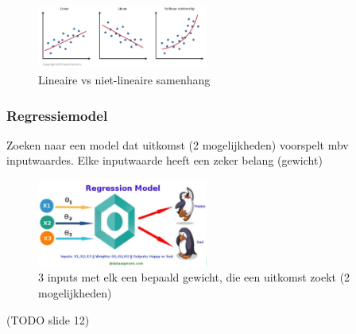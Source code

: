 \documentclass{article}
\begin{document}
\begin{figure}[H]
    \centering
    \includegraphics[width=0.5\textwidth]{regressie2.png}
    \caption{Lineaire vs niet-lineaire samenhang}
\end{figure}

\subsubsection{Regressiemodel}

Zoeken naar een model dat uitkomst (2 mogelijkheden) voorspelt mbv inputwaardes.
Elke inputwaarde heeft een zeker belang (gewicht)

\begin{figure}[H]
    \centering
    \includegraphics[width=0.5\textwidth]{regressiemodel.png}
    \caption{3 inputs met elk een bepaald gewicht, die een uitkomst zoekt (2 mogelijkheden)}
\end{figure}

(TODO slide 12)
\end{document}
